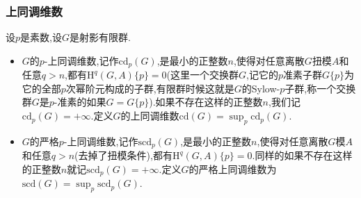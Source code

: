 \subsubsection{上同调维数}

设$p$是素数,设$G$是射影有限群.
\begin{itemize}
	\item $G$的$p$-上同调维数,记作$\mathrm{cd}_p(G)$,是最小的正整数$n$,使得对任意离散$G$扭模$A$和任意$q>n$,都有$\mathrm{H}^q(G,A)\{p\}=0$(这里一个交换群$G$,记它的$p$准素子群$G\{p\}$为它的全部$p$次幂阶元构成的子群,有限群时候这就是$G$的Sylow-$p$子群,称一个交换群$G$是$p$-准素的如果$G=G\{p\}$).如果不存在这样的正整数$n$,我们记$\mathrm{cd}_p(G)=+\infty$.定义$G$的上同调维数$\mathrm{cd}(G)=\sup_p\mathrm{cd}_p(G)$.
	\item $G$的严格$p$-上同调维数,记作$\mathrm{scd}_p(G)$,是最小的正整数$n$,使得对任意离散$G$模$A$和任意$q>n$(去掉了扭模条件),都有$\mathrm{H}^q(G,A)\{p\}=0$.同样的如果不存在这样的正整数$n$就记$\mathrm{scd}_p(G)=+\infty$.定义$G$的严格上同调维数为$\mathrm{scd}(G)=\sup_p\mathrm{scd}_p(G)$.
\end{itemize}
